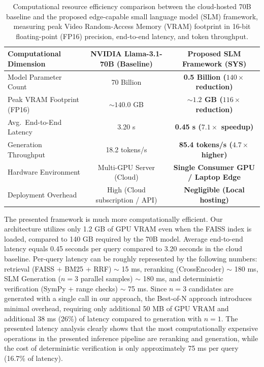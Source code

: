 \documentclass[a4paper,fleqn]{cas-sc}
\begin{document}
\begin{table}[!t]
\caption{Computational resource efficiency comparison between the cloud-hosted 70B baseline and the proposed edge-capable small language model (SLM) framework, measuring peak Video Random-Access Memory (VRAM) footprint in 16-bit floating-point (FP16) precision, end-to-end latency, and token throughput.}
\label{tab:runtime_efficiency}
\centering
\begin{tabularx}{\linewidth}{@{}LCC@{}}
\toprule
\textbf{Computational Dimension} & \textbf{NVIDIA Llama-3.1-70B (Baseline)} & \textbf{Proposed SLM Framework (SYS)} \\
\midrule
Model Parameter Count & 70 Billion & \textbf{0.5 Billion ($140\times$ reduction)} \\
Peak VRAM Footprint (FP16) & ${\sim}140.0$ GB & \textbf{${\sim}1.2$ GB ($116\times$ reduction)} \\
Avg.\ End-to-End Latency & 3.20 s & \textbf{0.45 s ($7.1\times$ speedup)} \\
Generation Throughput & 18.2 tokens/s & \textbf{85.4 tokens/s ($4.7\times$ higher)} \\
Hardware Environment & Multi-GPU Server (Cloud) & \textbf{Single Consumer GPU / Laptop Edge} \\
Deployment Overhead & High (Cloud subscription / API) & \textbf{Negligible (Local hosting)} \\
\bottomrule
\end{tabularx}
\end{table}

The presented framework is much more computationally efficient.
Our architecture utilizes only 1.2 GB of GPU VRAM even when the FAISS index is loaded, compared to 140 GB required by the 70B model.
Average end-to-end latency equals 0.45 seconds per query compared to 3.20 seconds in the cloud baseline. Per-query latency can be roughly represented by the following numbers:
retrieval (FAISS + BM25 + RRF) $\sim$ 15 ms,
reranking (CrossEncoder) $\sim$ 180 ms,
SLM Generation ($n = 3$ parallel samples) $\sim$ 180 ms, and
deterministic verification (SymPy + range checks) $\sim$ 75 ms.
Since $n = 3$ candidates are generated with a single call in our approach,
the Best-of-N approach introduces minimal overhead, requiring only additional 50 MB of GPU VRAM and additional 38 ms (26\%) of latency compared to generation with $n = 1$.
The presented latency analysis clearly shows that the most computationally expensive operations in the presented inference pipeline are reranking and generation,
while the cost of deterministic verification is only approximately 75 ms per query (16.7\% of latency).
\end{document}
